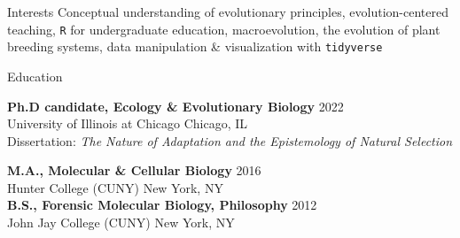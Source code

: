 \documentclass[]{resume}
\begin{document}
\begin{rSection}{Interests}
Conceptual understanding of evolutionary principles, evolution-centered
teaching, \texttt{R} for \linebreak undergraduate education,
macroevolution, the evolution of plant breeding systems, data
\linebreak manipulation \& visualization with \texttt{tidyverse}
\end{rSection}


\begin{rSection}{Education}

	\textbf{Ph.D candidate, Ecology \& Evolutionary Biology} \hfill 2022\\ 
	University of Illinois at Chicago \hfill Chicago, IL\\
     
    \vspace{-0.7cm}
     Dissertation: \emph{The Nature of Adaptation and the Epistemology
of Natural Selection} \vspace{0.3cm}

      

	\textbf{M.A., Molecular \& Cellular Biology} \hfill 2016\\ 
	Hunter College (CUNY) \hfill New York, NY\\
     

	\textbf{B.S., Forensic Molecular Biology, Philosophy} \hfill 2012\\ 
	John Jay College (CUNY) \hfill New York, NY\\
     


\end{rSection}

\end{document}
